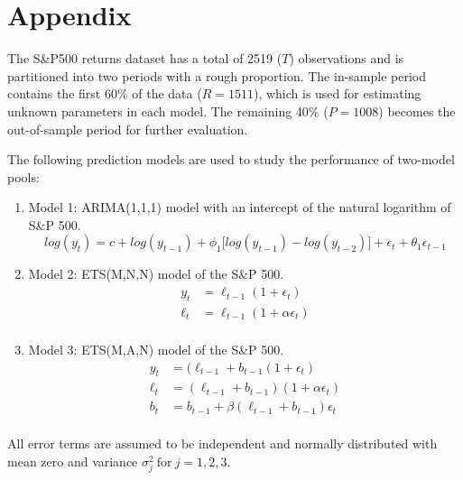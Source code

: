 \documentclass{monashthesis}
\begin{document}
\appendix

\hypertarget{appendix}{%
\chapter{Appendix}\label{appendix}}

The S\&P500 returns dataset has a total of 2519 (\(T\)) observations and is partitioned into two periods with a rough proportion. The in-sample period contains the first 60\% of the data (\(R = 1511\)), which is used for estimating unknown parameters in each model. The remaining 40\% (\(P = 1008\)) becomes the out-of-sample period for further evaluation.

The following prediction models are used to study the performance of two-model pools:

\begin{enumerate}
\def\labelenumi{\arabic{enumi}.}
\item
  Model 1: ARIMA(1,1,1) model with an intercept of the natural logarithm of S\&P 500.
  \begin{equation*}
  log(y_t) = c + log(y_{t-1}) + \phi_1\big[log(y_{t-1})-log(y_{t-2})\big] + \epsilon_t + \theta_1\epsilon_{t-1}
  \end{equation*}
\item
  Model 2: ETS(M,N,N) model of the S\&P 500.
  \begin{align*}
  y_t &= \ell_{t-1} (1+\epsilon_t) \\
  \ell_t &= \ell_{t-1} (1+\alpha \epsilon_t) \\
  \end{align*}
\item
  Model 3: ETS(M,A,N) model of the S\&P 500.
  \begin{align*}
  y_t &= (\ell_{t-1} + b_{t-1} (1+\epsilon_t) \\
  \ell_t &= (\ell_{t-1} + b_{t-1}) (1+\alpha \epsilon_t) \\
  b_t &= b_{t-1} + \beta (\ell_{t-1} + b_{t-1})\epsilon_t \\
  \end{align*}
\end{enumerate}

All error terms are assumed to be independent and normally distributed with mean zero and variance \(\sigma_j^2 \ \text{for}\  j = 1,2,3\).
\end{document}
